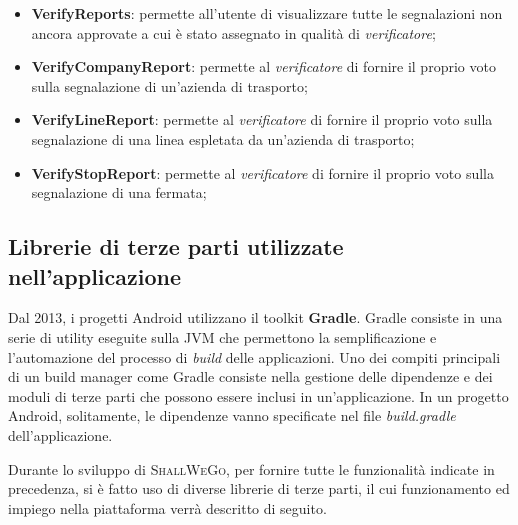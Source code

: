 \begin{itemize}
                \item \textbf{VerifyReports}: permette all'utente di visualizzare tutte le segnalazioni non ancora approvate a cui è stato assegnato in qualità di \textit{verificatore};
                \item \textbf{VerifyCompanyReport}: permette al \textit{verificatore} di fornire il proprio voto sulla segnalazione di un'azienda di trasporto;
                \item \textbf{VerifyLineReport}: permette al \textit{verificatore} di fornire il proprio voto sulla segnalazione di una linea espletata da un'azienda di trasporto;
                \item \textbf{VerifyStopReport}: permette al \textit{verificatore} di fornire il proprio voto sulla segnalazione di una fermata;
            \end{itemize}
        
            \subsection{Librerie di terze parti utilizzate nell'applicazione}
                Dal 2013, i progetti Android utilizzano il toolkit \textbf{Gradle}. Gradle consiste in una serie di utility eseguite sulla JVM che permettono la semplificazione e l'automazione del processo di \textit{build} delle applicazioni. Uno dei compiti principali di un build manager come Gradle consiste nella gestione delle dipendenze e dei moduli di terze parti che possono essere inclusi in un'applicazione. In un progetto Android, solitamente, le dipendenze vanno specificate nel file \textit{build.gradle} dell'applicazione.

                Durante lo sviluppo di \textsc{ShallWeGo}, per fornire tutte le funzionalità indicate in precedenza, si è fatto uso di diverse librerie di terze parti, il cui funzionamento ed impiego nella piattaforma verrà descritto di seguito.

